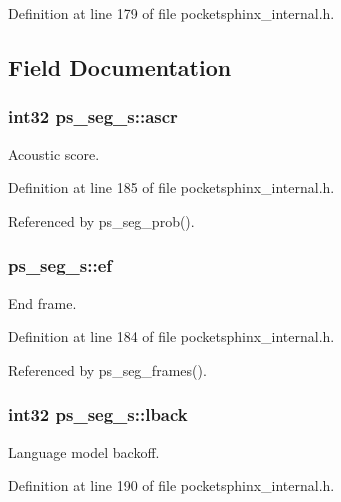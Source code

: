 Definition at line 179 of file pocketsphinx\-\_\-internal.\-h.



\subsection{Field Documentation}
\subsubsection[{ascr}]{\setlength{\rightskip}{0pt plus 5cm}int32 ps\-\_\-seg\-\_\-s\-::ascr}\label{structps__seg__s_a6f7706ec4c0d0ec8ecafaf0f29f41f4b}


Acoustic score. 



Definition at line 185 of file pocketsphinx\-\_\-internal.\-h.



Referenced by ps\-\_\-seg\-\_\-prob().

\subsubsection[{ef}]{ ps\-\_\-seg\-\_\-s\-::ef}\label{structps__seg__s_ab25ecc6af8d2695c6097cf7e934eadd4}


End frame. 



Definition at line 184 of file pocketsphinx\-\_\-internal.\-h.



Referenced by ps\-\_\-seg\-\_\-frames().

\subsubsection[{lback}]{\setlength{\rightskip}{0pt plus 5cm}int32 ps\-\_\-seg\-\_\-s\-::lback}\label{structps__seg__s_a4d86c21f1ed2dc3eb3b1b1b37ce9bb48}


Language model backoff. 



Definition at line 190 of file pocketsphinx\-\_\-internal.\-h.



